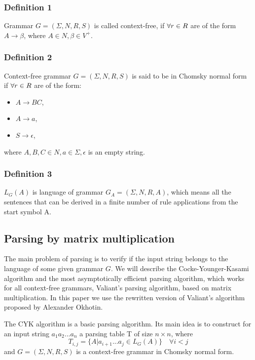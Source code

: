 \documentclass[runningheads]{llncs}
\begin{document}
\subsubsection{Definition 1} Grammar $G = (\Sigma, N, R, S)$ is called context-free, if $\space\forall r \in R$ are of the form $A \rightarrow \beta$, where $A \in N, \beta \in V^{+}$. 

\subsubsection{Definition 2} Context-free grammar $G = (\Sigma, N, R, S)$ is said to be in Chomsky normal form if $\space\forall r \in R$ are of the form: 
\begin{itemize}
  \item $A \rightarrow BC$,
  \item $A \rightarrow a$,
  \item $S \rightarrow \epsilon$, 
\end{itemize}
where $A, B, C \in N, a \in \Sigma, \epsilon$ is an empty string. 

\subsubsection{Definition 3} $L_{G}(A)$ is language of grammar $G_{A} = (\Sigma, N, R, A)$, which means all the sentences that can be derived in a finite number of rule applications from the start symbol A.

\subsection{Parsing by matrix multiplication}
  
The main problem of parsing is to verify if the input string belongs to the language of some given grammar $G$. We will describe the Cocke-Younger-Kasami algorithm and the most asymptotically efficient parsing algorithm, which works for all context-free grammars, Valiant's parsing algorithm, based on matrix multiplication. In this paper we use the rewritten version of Valiant's algorithm proposed by Alexander Okhotin. 

The CYK algorithm is a basic parsing algorithm. Its main idea is to construct for an input string $a_{1}a_{2}...a_{n}$ a parsing table T of size $n \times n$,  where 
\begin{equation}
T_{i, j} =  \{ A |  a_{i + 1}...a_{j} \in L_{G}(A)\} \quad \forall i < j
\end{equation}
and $G = (\Sigma, N, R, S)$ is a context-free grammar in Chomsky normal form. 
\end{document}
